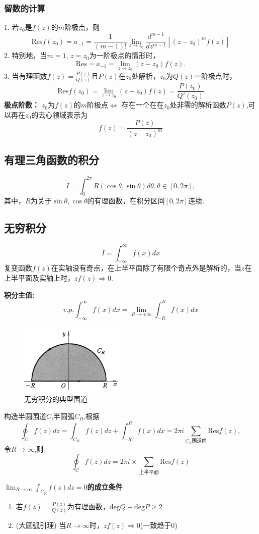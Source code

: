 \documentclass[11pt, a4paper, twoside]{ctexbook}
\begin{document}
\subsubsection{留数的计算}
1. 若$z_0$是$f(z)$的$m$阶极点，则
$$\mathrm{Res}f(z_0) = a_{-1} = \frac{1}{(m-1)!}\lim_{z\to z_0}{\frac{d^{m-1}}{dz^{m-1}}[(z-z_0)^mf(z)]}$$
2. 特别地，当$m = 1$, $z=z_0$为一阶极点的情形时，$$\mathrm{Res} = a_{-1} = \lim_{z\to z_0}(z - z_0)f(z).$$
3. 当有理函数$f(z) =\frac{P(z)}{Q(z)}$且$P(z)$在$z_0$处解析，$z_0$为$Q(z)$一阶极点时，
$$\mathrm{Res}f(z_0) = \lim_{z\to z_0}(z-z_0)f(z)= \frac{P(z_0)}{Q'(z_0)}$$
\textbf{极点阶数：}
$z_0$为$f(z)$的$m$阶极点$\Longleftrightarrow$ 存在一个在在$z_0$处非零的解析函数$P(z)$,可以再在$z_0$的去心领域表示为$$f(z) = \frac{P(z)}{(z-z_0)^m}$$
\subsection{有理三角函数的积分}
$$I = \int_0^{2\pi} R(\cos\theta, \sin\theta)d\theta, \theta \in [0,2\pi],$$
其中，$R$为关于$\sin\theta,\cos\theta$的有理函数，在积分区间$[0,2\pi]$连续.
\subsection{无穷积分}
$$I = \int_{-\infty}^{\infty} f(x)dx$$
复变函数$f(z)$在实轴没有奇点，在上半平面除了有限个奇点外是解析的，当$z$在上半平面及实轴上时，$zf(z)\Rightarrow 0$.

\textbf{积分主值:}
$$v.p.\int_{-\infty}^{\infty} f(x)dx = \lim_{R\to +\infty}\int_{-R}^Rf(x)dx$$
\begin{figure}[htbp]
    \centering
    \includegraphics[width = 5cm]{无穷积分围道.png}
    \caption{无穷积分的典型围道}
\end{figure}
构造半圆围道$C$,半圆弧$C_R$,根据
$$\oint_{C}f(z)dz = \int_{C_R}f(z)dz + \int_{-R}^R f(x)dx = 2\pi i \sum_{C_R围道内}\mathrm{Res}{f(z)},$$
令$R\to \infty$,则$$\oint_{C}f(z)dz = 2\pi i \times \sum_{\text{上半平面}}\mathrm{Res}{f(z)}$$

$\lim_{R\to \infty}\int_{C_R}f(z)dz = 0$\textbf{的成立条件}
\begin{enumerate}
    \item 若$f(z) =\frac{P(z)}{Q(z)}$为有理函数，$\mathrm{deg}Q- \mathrm{deg}P \ge 2$
    \item  (大圆弧引理) 当$R\to \infty $时，$zf(z) \Rightarrow 0$(一致趋于0) 
\end{enumerate}
\end{document}
